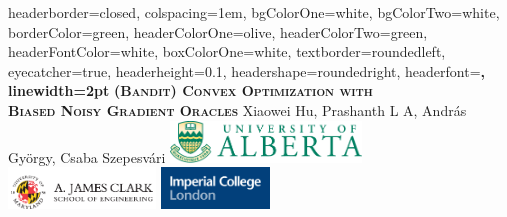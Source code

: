 \documentclass[landscape,a0paper,fontscale=0.285]{baposter} %
\begin{document}
\begin{poster}
{
headerborder=closed, %
colspacing=1em, %
bgColorOne=white, %
bgColorTwo=white, %
borderColor=green, %
headerColorOne=olive, %
headerColorTwo=green, %
headerFontColor=white, %
boxColorOne=white, %
textborder=roundedleft, %
eyecatcher=true, %
headerheight=0.1\textheight, %
headershape=roundedright, %
headerfont=\Large\bf\textsc, %
linewidth=2pt %
}
%
{}
{\bf\textsc{(Bandit) Convex Optimization with\\ Biased Noisy Gradient Oracles}\vspace{0.2em}} %
{ Xiaowei  Hu, Prashanth L A, Andr\'as Gy\"orgy, Csaba Szepesv\'ari } %
{\includegraphics[height=3em]{u-of-alberta-logo.pdf}
\hspace{12pt}
\includegraphics[height=3em]{clark.png}
\hspace{12pt}
\includegraphics[height=3em]{icl.png}} %




\end{poster}
\end{document}
